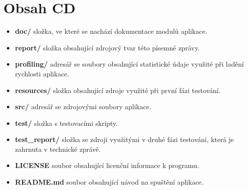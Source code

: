 
%



\chapter{Obsah CD}

\begin{itemize}
    \item \textbf{doc/} složka, ve které se nachází dokumentace modulů aplikace.
    \item \textbf{report/} složka obsahující zdrojový tvar této písemné zprávy.
    \item \textbf{profiling/} adresář se soubory obsahující statistické údaje využité při ladění rychlosti aplikace.
    \item \textbf{resources/} složka obsahující zdroje využité při první fázi testování.
    \item \textbf{src/} adresář se zdrojovými soubory aplikace.
    \item \textbf{test/} složka s testovacími skripty.
    \item \textbf{test\_report/} složka se zdroji využitými v druhé fázi testování, která je zahrnuta v technické zprávě.
    \item \textbf{LICENSE} soubor obsahující licenční informace k programu.
    \item \textbf{README.md} soubor obsahující návod na spuštění aplikace.
\end{itemize}


%
